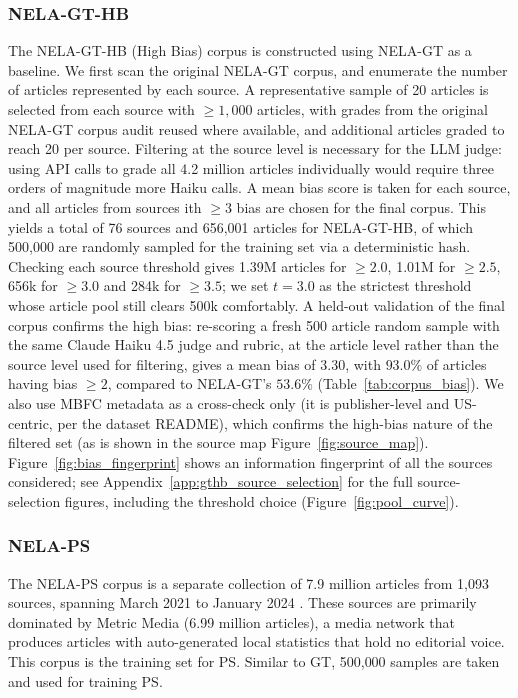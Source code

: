 \documentclass[12pt]{article}
\begin{document}
\subsubsection{NELA-GT-HB}
\label{subsec:gthb}
The NELA-GT-HB (High Bias) corpus is constructed using NELA-GT as a baseline.
We first scan the original NELA-GT corpus, and enumerate the number of articles represented by each source.
A representative sample of 20 articles is selected from each source with $\ge1{,}000$ articles, with grades from the original NELA-GT corpus audit reused where available, and additional articles graded to reach 20 per source.
Filtering at the source level is necessary for the LLM judge: using API calls to grade all 4.2 million articles individually would require three orders of magnitude more Haiku calls.  
A mean bias score is taken for each source, and all articles from sources ith $\ge3$ bias are chosen for the final corpus.
This yields a total of 76 sources and 656{,}001 articles for NELA-GT-HB, of which 500{,}000 are randomly sampled for the training set via a deterministic hash.
Checking each source threshold gives 1.39M articles for $\geq2.0$, 1.01M for $\geq2.5$, 656k for $\geq3.0$ and 284k for $\geq3.5$; we set $t=3.0$ as the strictest threshold whose article pool still clears 500k comfortably.
A held-out validation of the final corpus confirms the high bias: re-scoring a fresh 500 article random sample with the same Claude Haiku 4.5 judge and rubric, at the article level rather than the source level used for filtering, gives a mean bias of 3.30, with $93.0\%$ of articles having bias $\ge2$, compared to NELA-GT's $53.6\%$ (Table~\ref{tab:corpus_bias}).
We also use MBFC metadata as a cross-check only (it is publisher-level and US-centric, per the dataset README), which confirms the high-bias nature of the filtered set (as is shown in the source map Figure~\ref{fig:source_map}).
Figure~\ref{fig:bias_fingerprint} shows an information fingerprint of all the sources considered; see Appendix~\ref{app:gthb_source_selection} for the full source-selection figures, including the threshold choice (Figure~\ref{fig:pool_curve}).

\subsubsection{NELA-PS}
The NELA-PS corpus is a separate collection of 7.9 million articles from 1{,}093 sources, spanning
March 2021 to January 2024 \cite{horne2024nelaps}. These sources are primarily dominated by Metric Media (6.99 million articles), a media 
network that produces articles with auto-generated local statistics that hold no editorial voice. This corpus is the training set for PS. 
Similar to GT, 500{,}000 samples are taken and used for training PS. 
\end{document}
